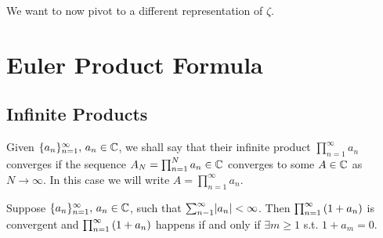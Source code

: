 \setcounter{section}{0}
\setcounter{theorem}{0}


We want to now pivot to a different representation of $\zeta$.

\section{Euler Product Formula}

\subsection{Infinite Products}
Given $\{ a_n \}_{n=1}^\infty, \, a_n \in \mathbb{C}$, we shall say that their infinite product $\prod_{n=1}^\infty a_n$ converges if the sequence $A_N = \prod_{n=1}^N a_n \in \mathbb{C}$ converges to some $A\in \mathbb{C}$ as $N \to \infty$. In this case we will write $A= \prod_{n=1}^\infty a_n$.

\begin{lemma}\label{lem:inf-prod-lemma}
Suppose $\{ a_n \}_{n=1}^\infty, \, a_n \in \mathbb{C}$, such that $\sum_{n-1}^\infty \abs{a_n} < \infty$. Then $\prod_{n=1}^\infty \left( 1+a_n \right)$ is convergent and $\prod_{n=1}^\infty \left( 1+a_n \right)$ happens if and only if $\exists m \geq 1 $ s.t. $1+a_m = 0$.
\end{lemma}

